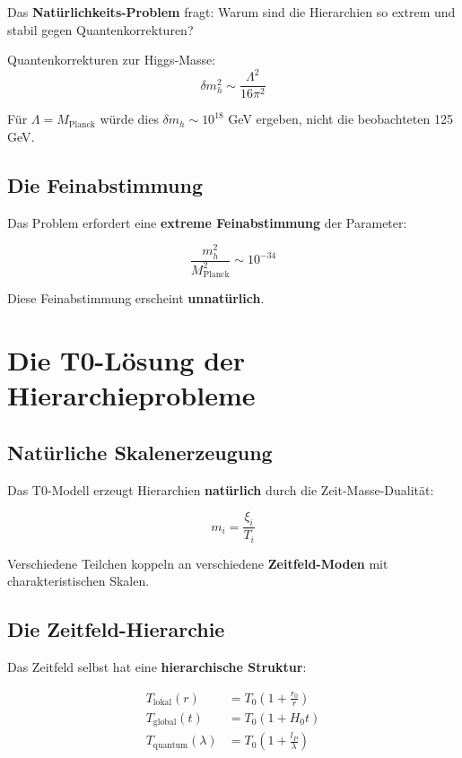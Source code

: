 \documentclass[12pt,a4paper]{report}
\begin{document}
	Das \textbf{Natürlichkeits-Problem} fragt: Warum sind die Hierarchien so extrem und stabil gegen Quantenkorrekturen?
	
	Quantenkorrekturen zur Higgs-Masse:
	\begin{equation}
		\delta m_h^2 \sim \frac{\Lambda^2}{16\pi^2}
	\end{equation}
	
	Für $\Lambda = M_{\text{Planck}}$ würde dies $\delta m_h \sim 10^{18}$ GeV ergeben, nicht die beobachteten 125 GeV.
	
	\subsection{Die Feinabstimmung}
	
	Das Problem erfordert eine \textbf{extreme Feinabstimmung} der Parameter:
	
	\begin{equation}
		\frac{m_h^2}{M_{\text{Planck}}^2} \sim 10^{-34}
	\end{equation}
	
	Diese Feinabstimmung erscheint \textbf{unnatürlich}.
	
	\section{Die T0-Lösung der Hierarchieprobleme}
	
	\subsection{Natürliche Skalenerzeugung}
	
	Das T0-Modell erzeugt Hierarchien \textbf{natürlich} durch die Zeit-Masse-Dualität:
	
	\begin{equation}
		m_i = \frac{\xi_i}{T_i}
	\end{equation}
	
	Verschiedene Teilchen koppeln an verschiedene \textbf{Zeitfeld-Moden} mit charakteristischen Skalen.
	
	\subsection{Die Zeitfeld-Hierarchie}
	
	Das Zeitfeld selbst hat eine \textbf{hierarchische Struktur}:
	
	\begin{align}
		T_{\text{lokal}}(r) &= T_0\left(1 + \frac{r_0}{r}\right) \\
		T_{\text{global}}(t) &= T_0(1 + H_0 t) \\
		T_{\text{quantum}}(\lambda) &= T_0\left(1 + \frac{l_P}{\lambda}\right)
	\end{align}
	
\end{document}
